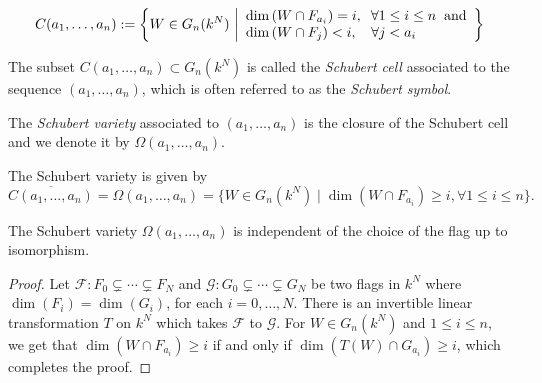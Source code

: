 \documentclass[a4paper,openany]{scrbook}
\begin{document}
\[
C(a_1,\dots ,a_n) := \left\{  W\in G_n(k^N)\ \middle\vert \begin{array}{l}
   \dim\left(W\cap F_{a_i}\right)=i, \hspace*{0.2cm}\forall 1\leq i\leq n \hspace*{0.2cm}  \text{and} \\
    \dim\left(W\cap F_{j}\right)<i,\hspace*{0.34cm}\forall j<a_i
  \end{array}\right\}
\]

\begin{defn}
The subset $C(a_1,\dots ,a_n)\subset G_n(k^N)$ is called the \textit{Schubert cell} associated to the sequence $(a_1,\dots ,a_n)$, which is often referred to as the \textit{Schubert symbol}. \par 
The \textit{Schubert variety} associated to $(a_1,\dots ,a_n)$ is the closure of the Schubert cell and we denote it by $\Omega(a_1,\dots ,a_n)$.
\end{defn}
The Schubert variety is given by 
\begin{equation*}
\overline{C(a_1,\dots ,a_n)} = \Omega(a_1,\dots ,a_n)=\lbrace W\in G_n(k^N) \mid \dim\left(W\cap F_{a_i}\right)\geq i, \forall 1\leq i\leq n \rbrace.
\end{equation*}
\begin{lemma}
The Schubert variety $\Omega(a_1,\dots , a_n)$ is independent of the choice of the flag up to isomorphism.
\end{lemma}
\begin{proof}
Let $\mathcal{F}:F_0\subsetneq \cdots \subsetneq F_N$ and $\mathcal{G}:G_0\subsetneq \cdots \subsetneq G_N$ be two flags in $k^N$ where $\dim(F_i)=\dim(G_i)$, for each $i=0,\dots ,N$. There is an invertible linear transformation $T$ on $k^N$ which takes $\mathcal{F}$ to $\mathcal{G}$. For $W\in G_n(k^N)$ and $1\leq i\leq n$, we get that  $\dim(W\cap F_{a_i})\geq i$ if and only if $\dim(T(W)\cap G_{a_i})\geq i$, which completes the proof.
\end{proof}

\end{document}
